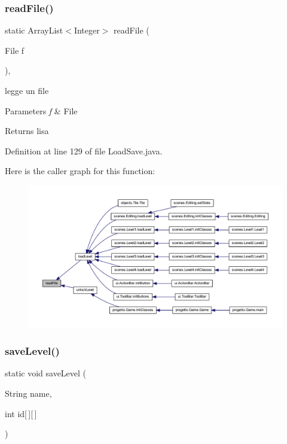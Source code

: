 \subsubsection{\texorpdfstring{read\+File()}{readFile()}}
{\footnotesize\ttfamily static Array\+List$<$Integer$>$ read\+File (\begin{DoxyParamCaption}\item[{File}]{f }\end{DoxyParamCaption})\hspace{0.3cm}{\ttfamily [static]}, {\ttfamily [private]}}



legge un file 


\begin{DoxyParams}{Parameters}
{\em f} & File \\
\hline
\end{DoxyParams}
\begin{DoxyReturn}{Returns}
lisa 
\end{DoxyReturn}


Definition at line 129 of file Load\+Save.\+java.

Here is the caller graph for this function\+:\nopagebreak
\begin{figure}[H]
\begin{center}
\leavevmode
\includegraphics[width=350pt]{classhelpz_1_1_load_save_a62d3bd4e3f361e1f99bd9d21a7d21b0d_icgraph}
\end{center}
\end{figure}
\mbox{\label{classhelpz_1_1_load_save_ae7a60134f1712407689bfe3c45bc04a1}} 
\subsubsection{\texorpdfstring{save\+Level()}{saveLevel()}\hspace{0.1cm}{\footnotesize\ttfamily [1/2]}}
{\footnotesize\ttfamily static void save\+Level (\begin{DoxyParamCaption}\item[{String}]{name,  }\item[{int}]{id\mbox{[}$\,$\mbox{]}\mbox{[}$\,$\mbox{]} }\end{DoxyParamCaption})\hspace{0.3cm}{\ttfamily [static]}}




